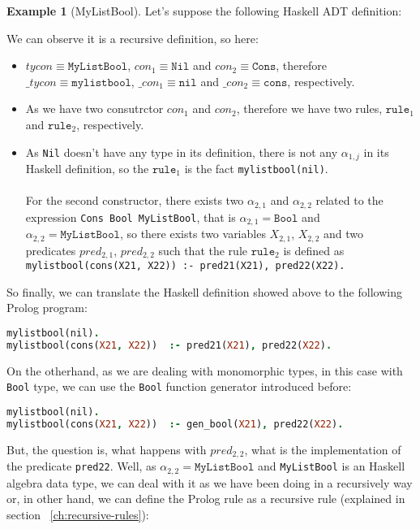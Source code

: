\documentclass{report}
\theoremstyle{definition}
\newtheorem{example}{Example}[section]
\theoremstyle{definition}
\newcommand{\ttt}[1]{\texttt{#1}}
\begin{document}
\begin{example}[MyListBool]
	Let's suppose the following Haskell ADT definition:
	
	We can observe it is a recursive definition, so here:
	\begin{itemize}
		\item $tycon \equiv \ttt{MyListBool}$, $con_1 \equiv \ttt{Nil}$ and $con_2 \equiv \ttt{Cons}$, therefore $\_tycon \equiv \ttt{mylistbool}$, $\_con_1 \equiv \ttt{nil}$ and $\_con_2 \equiv \ttt{cons}$, respectively.
		\item As we have two consutrctor $con_1$ and $con_2$, therefore we have two rules, $\ttt{rule}_1$ and $\ttt{rule}_2$, respectively.
		\item As \ttt{Nil} doesn't have any type in its definition, there is not any $\alpha_{1,j}$ in its Haskell definition, so the $\ttt{rule}_1$ is the fact \ttt{mylistbool(nil)}.\\\\
		For the second constructor, there exists two $\alpha_{2,1}$ and $\alpha_{2,2}$ related to the expression \ttt{Cons Bool MyListBool}, that is $\alpha_{2,1} = \ttt{Bool}$ and $\alpha_{2,2} = \ttt{MyListBool}$, so there exists two variables $X_{2,1}$, $X_{2,2}$ and two predicates $pred_{2,1}$, $pred_{2,2}$ such that the rule $\ttt{rule}_2$ is defined as \\ \ttt{mylistbool(cons(X21, X22)) :- pred21(X21), pred22(X22).}
	\end{itemize}
	So finally, we can translate the Haskell definition showed above to the following Prolog program:\\
\begin{lstlisting}[language=Prolog]
mylistbool(nil).																										%% rule 1
mylistbool(cons(X21, X22)) 	:- pred21(X21), pred22(X22).						%% rule 2
\end{lstlisting}
On the otherhand, as we are dealing with monomorphic types, in this case with \ttt{Bool} type, we can use the \ttt{Bool} function generator introduced before:\\
\begin{lstlisting}[language=Prolog]
mylistbool(nil).																										%% rule 1
mylistbool(cons(X21, X22)) 	:- gen_bool(X21), pred22(X22).					%% rule 2
\end{lstlisting}
But, the question is, what happens with $pred_{2,2}$, what is the implementation of the predicate \ttt{pred22}. Well, as $\alpha_{2,2} = \ttt{MyListBool}$ and \ttt{MyListBool} is an Haskell algebra data type, we can deal with it as we have been doing in a recursively way or, in other hand, we can define the Prolog rule as a recursive rule (explained in section ~\ref{ch:recursive-rules}):\\

\end{example}
\end{document}
